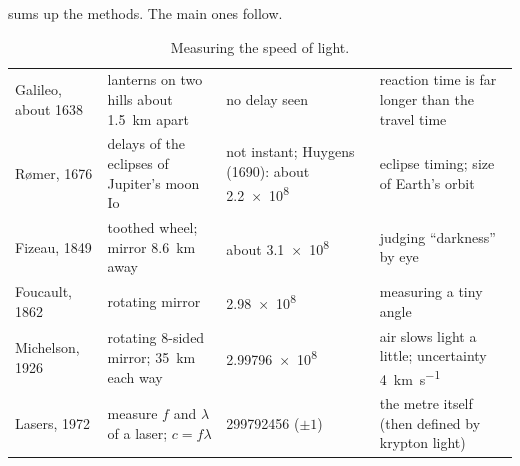  sums up the methods. The main ones follow.

\begin{table}
  \caption{Measuring the speed of light.}\label{ch1:tab:history}
  \centering\small
  \begin{tabular}{@{}L{24mm}L{39mm}L{31mm}L{42mm}@{}}
    \toprule
     &  &  &
      \\
    \midrule
    Galileo, about 1638 & lanterns on two hills about \qty{1.5}{km} apart & no delay seen &
      reaction time is far longer than the travel time\\
    Rømer, 1676 & delays of the eclipses of Jupiter's moon Io & not instant; Huygens (1690):
      about \num{2.2e8} & eclipse timing; size of Earth's orbit\\
    Fizeau, 1849 & toothed wheel; mirror \qty{8.6}{km} away & about \num{3.1e8} & judging
      ``darkness'' by eye\\
    Foucault, 1862 & rotating mirror & \num{2.98e8} & measuring a tiny angle\\
    Michelson, 1926 & rotating 8-sided mirror; \qty{35}{km} each way & \num{2.99796e8} &
      air slows light a little; uncertainty \qty{4}{km.s^{-1}}\\
    Lasers, 1972 & measure $f$ and $\lambda$ of a laser; $c = f\lambda$ & \num{299792456}
      ($\pm1$) & the metre itself (then defined by krypton light)\\
    \bottomrule
  \end{tabular}
\end{table}

